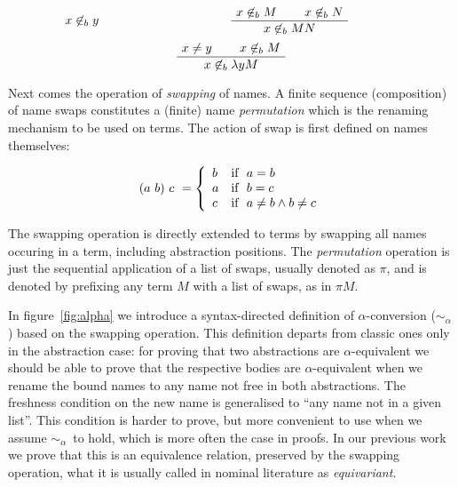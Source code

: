 \documentclass[preprint,10pt]{sigplanconf}
\newcommand{\lam}{\ensuremath{\lambda}}
\newcommand{\alpsym}{\ensuremath{\sim_\alpha}}
\newcommand{\ninb}{\ensuremath{\not\in_b}}
\begin{document}
\[
\begin{minipage}{0.4\linewidth}
   \LeftLabel{\ninb v} \AxiomC{$x \ninb y$} \DisplayProof
\end{minipage}
\begin{minipage}{0.4\linewidth}
  \AxiomC{$x \ninb M$} 
  \AxiomC{$x \ninb N$}
  \BinaryInfC{$x \ninb M N$} \DisplayProof
\end{minipage}
\]
\[
\begin{minipage}{0.75\linewidth}
\center
  \AxiomC{$x \neq y$}
  \AxiomC{$x \ninb M$}
  \BinaryInfC{$x  \ninb  \lambda y M$} \DisplayProof
\end{minipage}
\]

Next comes the operation of \emph{swapping} of names. A finite sequence (composition) of name swaps constitutes a (finite) name \emph{permutation} which is the renaming mechanism to be used on terms. The action of  swap is first defined on names themselves:

\[ (a\ b)\ c\ = \left\{
  \begin{array}{ll}
    b & $if$\ \ a = b \\
    a & $if$\ \ b = c \\
    c & $if$\ \ a \neq b \wedge b \neq c \\ 
  \end{array} \right.
\]

The swapping operation is directly extended to terms by swapping all names occuring in a term, including abstraction positions. The \emph{permutation} operation is just the sequential application of a list of swaps, usually denoted as $\pi$, and is denoted by prefixing any term $M$ with a list of swaps, as in $\pi M$.

In figure~\ref{fig:alpha} we introduce a syntax-directed definition of $\alpha$-conversion (\alpsym) based on the swapping operation. 
This definition departs from classic ones only in the abstraction case: 
for proving that two abstractions are $\alpha$-equivalent we should be able to prove that the respective bodies are $\alpha$-equivalent when we rename the bound names to any name not free in both abstractions. 
The freshness condition on the new name is generalised to ``any name not in a given list''.%
This condition is harder to prove, but more convenient to use when we assume \alpsym\ to hold, which is more often the case in proofs. 
In our previous work we prove that this is an equivalence relation, preserved by the swapping operation, what it is usually called in nominal literature as \emph{equivariant}.
\end{document}
